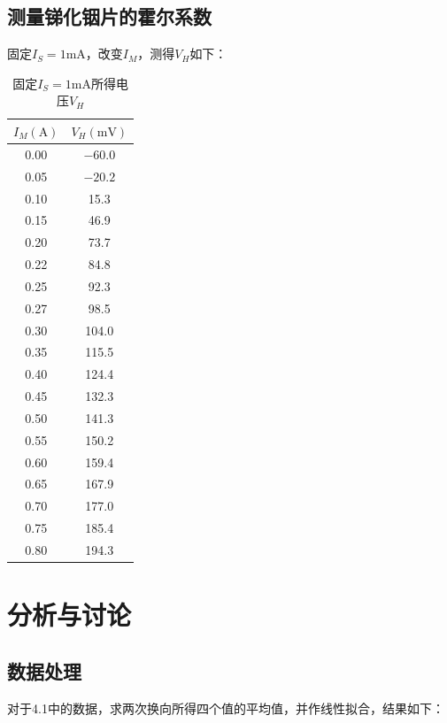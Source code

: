 \documentclass[UTF8]{ctexart}
\begin{document}
\subsection{测量锑化铟片的霍尔系数}
固定$I_S = 1\mathrm{mA}$，改变$I_M$，测得$V_{H}$如下：

\begin{table}[h]
  \centering
  \begin{tabular}{cc}
    \hline\hline
    $I_M(\mathrm{A})$ & $V_{H}(\mathrm{mV})$ \\
    \hline
    0.00 & $-60.0$ \\
    0.05 & $-20.2$ \\
    0.10 & 15.3 \\
    0.15 & 46.9 \\
    0.20 & 73.7 \\
    0.22 & 84.8 \\
    0.25 & 92.3 \\
    0.27 & 98.5 \\
    0.30 & 104.0 \\
    0.35 & 115.5 \\
    0.40 & 124.4 \\
    0.45 & 132.3 \\
    0.50 & 141.3 \\
    0.55 & 150.2 \\
    0.60 & 159.4 \\
    0.65 & 167.9 \\
    0.70 & 177.0 \\
    0.75 & 185.4 \\
    0.80 & 194.3 \\
    \hline\hline
  \end{tabular}
  \caption{固定$I_S = 1\mathrm{mA}$所得电压$V_H$}
\end{table}
\section{分析与讨论}
\subsection{数据处理}
对于4.1中的数据，求两次换向所得四个值的平均值，并作线性拟合，结果如下：
\end{document}
